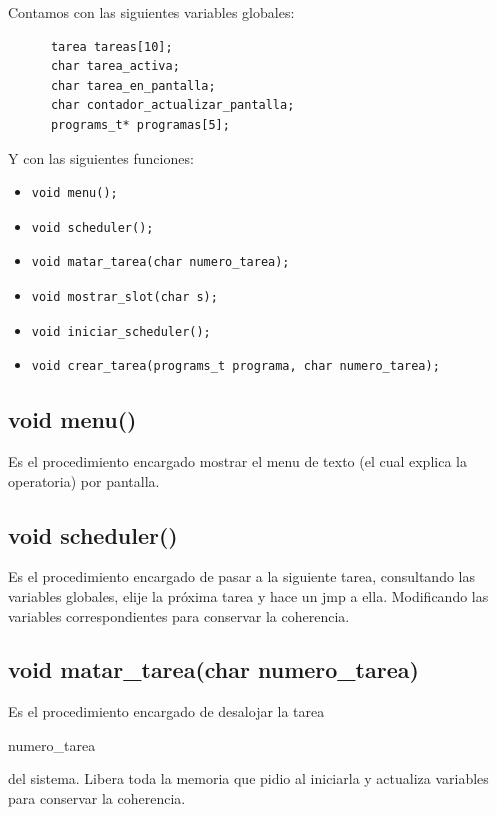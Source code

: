 \documentclass[a4paper,10pt]{article}
\begin{document}
Contamos con las siguientes variables globales:

\begin{verbatim}
      tarea tareas[10];
      char tarea_activa;	
      char tarea_en_pantalla;
      char contador_actualizar_pantalla;
      programs_t* programas[5];
\end{verbatim}


Y con las siguientes funciones:

\begin{itemize}
\item \begin{verbatim}void menu(); \end{verbatim}
\item \begin{verbatim}void scheduler();\end{verbatim}
\item \begin{verbatim}void matar_tarea(char numero_tarea);\end{verbatim}
\item \begin{verbatim}void mostrar_slot(char s);\end{verbatim}
\item \begin{verbatim}void iniciar_scheduler();\end{verbatim}
\item \begin{verbatim}void crear_tarea(programs_t programa, char numero_tarea);\end{verbatim}
\end{itemize}

\subsection*{ void menu()}
Es el procedimiento encargado mostrar el menu de texto (el cual explica la operatoria) por pantalla.

\subsection*{ void scheduler()}
Es el procedimiento encargado de pasar a la siguiente tarea, consultando las variables globales, elije la próxima tarea y hace un jmp a ella. Modificando las variables correspondientes para conservar la coherencia.

\subsection*{ void matar\_tarea(char numero\_tarea) }
Es el procedimiento encargado de desalojar la tarea \begin{it}numero\_tarea\end{it} del sistema. Libera toda la memoria que pidio al iniciarla y actualiza variables para conservar la coherencia.
\end{document}
